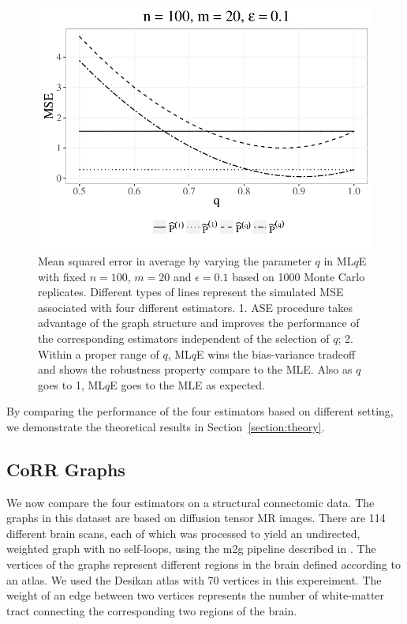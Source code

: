 \documentclass[a4paper]{article}
\begin{document}
\begin{figure}[!htb]
\centering
\includegraphics[width=1\textwidth]{sim_q.pdf}
\caption{Mean squared error in average by varying the parameter $q$ in ML$q$E with fixed $n = 100$, $m = 20$ and $\epsilon = 0.1$ based on 1000 Monte Carlo replicates. Different types of lines represent the simulated MSE associated with four different estimators.
1. ASE procedure takes advantage of the graph structure and improves the performance of the corresponding estimators independent of the selection of $q$;
2. Within a proper range of $q$, ML$q$E wins the bias-variance tradeoff and shows the robustness property compare to the MLE. Also as $q$ goes to 1, ML$q$E goes to the MLE as expected.}
\label{fig:q}
\end{figure}

By comparing the performance of the four estimators based on different setting, we demonstrate the theoretical results in Section~\ref{section:theory}.


\subsection{CoRR Graphs}
\label{section:real_data}

We now compare the four estimators on a structural connectomic data. The graphs in this dataset are based on diffusion tensor MR images. There are 114 different brain scans, each of which was processed to yield an undirected, weighted graph with no self-loops, using the m2g pipeline described in \citep{kiar2016ndmg}. The vertices of the graphs represent different regions in the brain defined according to an atlas. We used the Desikan atlas with 70 vertices in this expereiment. The weight of an edge between two vertices represents the number of white-matter tract connecting the corresponding two regions of the brain.
\end{document}
